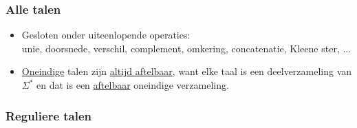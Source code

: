 \documentclass[kulak]{kulakarticle}
\theoremstyle{definition}
\begin{document}
	\subsubsection*{Alle talen}

	\begin{itemize}
		\item Gesloten onder uiteenlopende operaties:\\unie, doorsnede, verschil, complement, omkering, concatenatie, Kleene ster, ...
		\item \underline{Oneindige} talen zijn \underline{altijd aftelbaar}, want elke taal is een deelverzameling van \(\Sigma^*\) en dat is een \underline{aftelbaar} oneindige verzameling.
	\end{itemize}

		\newpage

	\subsubsection*{Reguliere talen}
\end{document}
